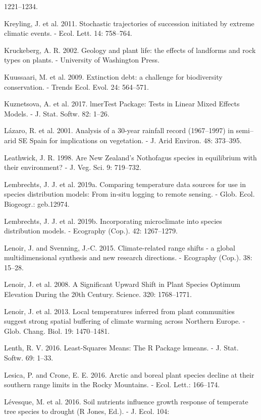 \documentclass[11pt,twoside]{reedthesis}
\begin{document}
1221--1234.\par
Kreyling, J. et al. 2011. Stochastic trajectories of succession
initiated by extreme climatic events. - Ecol. Lett. 14: 758--764.\par
Kruckeberg, A. R. 2002. Geology and plant life: the effects of landforms
and rock types on plants. - University of Washington Press.\par
Kuussaari, M. et al. 2009. Extinction debt: a challenge for biodiversity
conservation. - Trends Ecol. Evol. 24: 564--571.\par
Kuznetsova, A. et al. 2017. lmerTest Package: Tests in Linear Mixed
Effects Models. - J. Stat. Softw. 82: 1--26.\par
Lázaro, R. et al. 2001. Analysis of a 30-year rainfall record
(1967--1997) in semi--arid SE Spain for implications on vegetation. - J.
Arid Environ. 48: 373--395.\par
Leathwick, J. R. 1998. Are New Zealand's Nothofagus species in
equilibrium with their environment? - J. Veg. Sci. 9: 719--732.\par
Lembrechts, J. J. et al. 2019a. Comparing temperature data sources for
use in species distribution models: From in‐situ logging to remote
sensing. - Glob. Ecol. Biogeogr.: geb.12974.\par
Lembrechts, J. J. et al. 2019b. Incorporating microclimate into species
distribution models. - Ecography (Cop.). 42: 1267--1279.\par
Lenoir, J. and Svenning, J.-C. 2015. Climate-related range shifts - a
global multidimensional synthesis and new research directions. -
Ecography (Cop.). 38: 15--28.\par
Lenoir, J. et al. 2008. A Significant Upward Shift in Plant Species
Optimum Elevation During the 20th Century. Science. 320: 1768--1771.\par
Lenoir, J. et al. 2013. Local temperatures inferred from plant
communities suggest strong spatial buffering of climate warming across
Northern Europe. - Glob. Chang. Biol. 19: 1470--1481.\par
Lenth, R. V. 2016. Least-Squares Means: The R Package lsmeans. - J.
Stat. Softw. 69: 1--33.\par
Lesica, P. and Crone, E. E. 2016. Arctic and boreal plant species
decline at their southern range limits in the Rocky Mountains. - Ecol.
Lett.: 166--174.\par
Lévesque, M. et al. 2016. Soil nutrients influence growth response of
temperate tree species to drought (R Jones, Ed.). - J. Ecol. 104:
\end{document}
